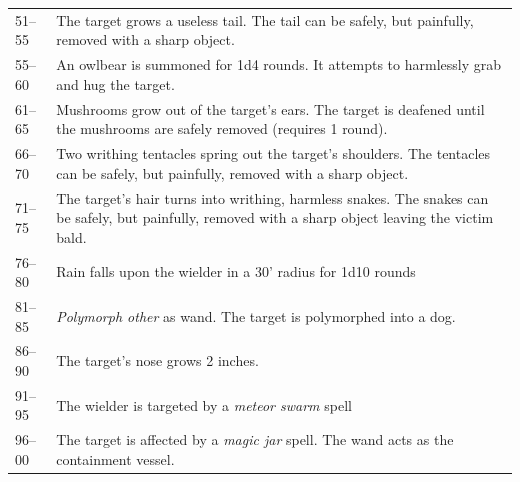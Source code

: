 \begin{longtable}{|p{}|p{}|}
\rowcolor[gray]{.9}51--55	& The target grows a useless tail.  The tail can be safely, but painfully, removed with a sharp object. \\
55--60	& An owlbear is summoned for 1d4 rounds.  It attempts to harmlessly grab and hug the target. \\
\rowcolor[gray]{.9}61--65	& Mushrooms grow out of the target's ears.  The target is deafened until the mushrooms are safely removed (requires 1 round). \\
66--70	& Two writhing tentacles spring out the target's shoulders.  The tentacles can be safely, but painfully, removed with a sharp object. \\
\rowcolor[gray]{.9}71--75	& The target's hair turns into writhing, harmless snakes.  The snakes can be safely, but painfully, removed with a sharp object leaving the victim bald. \\
76--80	& Rain falls upon the wielder in a 30' radius for 1d10 rounds \\
\rowcolor[gray]{.9}81--85	& \textit{Polymorph other} as wand.  The target is polymorphed into a dog. \\
86--90	& The target's nose grows 2 inches. \\
\rowcolor[gray]{.9}91--95	& The wielder is targeted by a \textit{meteor swarm} spell \\
96--00	& The target is affected by a \textit{magic jar} spell.  The wand acts as the containment vessel. \\
\end{longtable}

